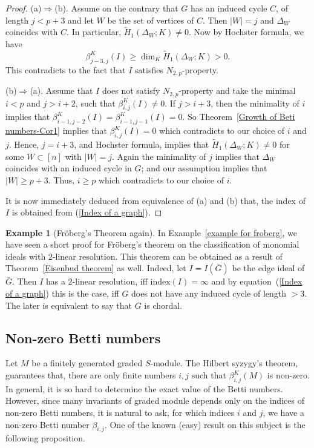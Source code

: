 \documentclass[a4paper,11pt]{amsart}
\theoremstyle{plain}
\theoremstyle{definition}
\newtheorem{ex}[thm]{Example}
\theoremstyle{remark}
\begin{document}
\begin{proof}
(a)$\Rightarrow$(b). Assume on the contrary that $G$ has an induced cycle $C$, of length $j < p+3$ and let $W$ be the set of vertices of $C$. Then $|W|=j$ and $\Delta_W$ coincides with $C$. In particular, $\tilde{H}_1 \left( \Delta_W; K \right) \neq 0$. Now by Hochster formula, we have
\[
\beta^K_{j-3,j} (I) \geq \dim_K \tilde{H}_1 \left( \Delta_W; K \right) >0.
\]
This contradicts to the fact that $I$ satisfies $N_{2,p}$-property.

(b)$\Rightarrow$(a). Assume that $I$ does not satisfy $N_{2,p}$-property and take the minimal  $i<p$ and $j>i+2$, such that $\beta^K_{i,j} (I) \neq 0$. If $j>i+3$, then the minimality of $i$ implies that $\beta^K_{i-1, j-2} \left( I \right) = \beta^K_{i-1,j-1}  \left( I \right) =0$. So Theorem~\ref{Growth of Beti numbers-Cor1} implies that $\beta^K_{i,j} \left( I \right) =0$ which contradicts to our choice of $i$ and $j$. Hence, $j=i+3$, and Hochster formula, implies that $\tilde{H}_1 \left( \Delta_W; K \right) \neq 0$ for some $W \subset [n]$ with $|W|= j$. Again the minimality of $j$ implies that $\Delta_W$ coincides with an induced cycle in $G$; and  our assumption implies that $|W| \geq p+3$. Thus, $i\geq p$ which contradicts to our choice of $i$.

It is now immediately deduced from equivalence of (a) and (b) that, the index of $I$ is obtained from (\ref{Index of a graph}).
\end{proof}

\begin{ex}[Fr\"oberg's Theorem again]
In Example~\ref{example for froberg},  we have seen a short proof for Fr\"oberg's theorem on the classification of monomial ideals with $2$-linear resolution. This theorem can be  obtained as a result of Theorem~\ref{Eisenbud theorem} as well. Indeed, let $I=I(\bar{G})$ be the edge ideal of $\bar{G}$. Then $I$ has a $2$-linear resolution, iff $\mathrm{index} (I) = \infty$ and by equation~(\ref{Index of a graph}) this is the case, iff $G$ does not have any induced cycle of length $>3$. The later is equivalent to say that $G$ is chordal.
\end{ex}

\subsection*{Non-zero Betti numbers}
Let $M$ be a finitely generated graded $S$-module. The Hilbert syzygy's theorem, guarantees  that, there are only finite numbers $i, j$ such that $\beta_{i,j}^K(M)$ is non-zero. In general, it is so hard to determine the exact value of the Betti numbers. However, since many invariants of graded module depends only on the indices of non-zero Betti numbers, it is natural to ask, for which indices $i$ and $j$, we have a non-zero Betti number $\beta_{i,j}$. One of the known (easy) result on this subject is the following proposition.
\end{document}
